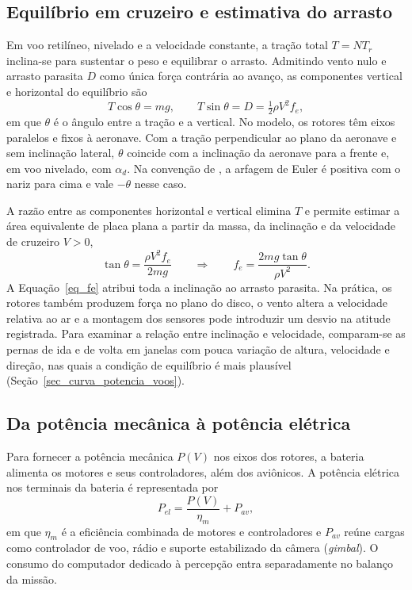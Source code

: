 \subsection{Equilíbrio em cruzeiro e estimativa do arrasto}

Em voo retilíneo, nivelado e a velocidade constante, a tração total $T=NT_r$ inclina-se para sustentar o peso e equilibrar o arrasto. Admitindo vento nulo e arrasto parasita $D$ como única força contrária ao avanço, as componentes vertical e horizontal do equilíbrio são \cite[p.~101, 109]{etkin1996}
\begin{equation}
  T\cos\theta = mg, \qquad T\sin\theta = D = \tfrac{1}{2}\rho V^{2} f_e,
  \label{eq_equilibrio}
\end{equation}
em que $\theta$ é o ângulo entre a tração e a vertical. No modelo, os rotores têm eixos paralelos e fixos à aeronave. Com a tração perpendicular ao plano da aeronave e sem inclinação lateral, $\theta$ coincide com a inclinação da aeronave para a frente e, em voo nivelado, com $\alpha_d$. Na convenção de , a arfagem de Euler é positiva com o nariz para cima e vale $-\theta$ nesse caso.

A razão entre as componentes horizontal e vertical elimina $T$ e permite estimar a área equivalente de placa plana a partir da massa, da inclinação e da velocidade de cruzeiro $V>0$,
\begin{equation}
  \tan\theta = \frac{\rho V^{2} f_e}{2 m g}
  \qquad\Longrightarrow\qquad
  f_e = \frac{2 m g \tan\theta}{\rho V^{2}}.
  \label{eq_fe}
\end{equation}
A Equação~\eqref{eq_fe} atribui toda a inclinação ao arrasto parasita. Na prática, os rotores também produzem força no plano do disco, o vento altera a velocidade relativa ao ar e a montagem dos sensores pode introduzir um desvio na atitude registrada. Para examinar a relação entre inclinação e velocidade, comparam-se as pernas de ida e de volta em janelas com pouca variação de altura, velocidade e direção, nas quais a condição de equilíbrio é mais plausível (Seção~\ref{sec_curva_potencia_voos}).

\subsection{Da potência mecânica à potência elétrica}

Para fornecer a potência mecânica $P(V)$ nos eixos dos rotores, a bateria alimenta os motores e seus controladores, além dos aviônicos. A potência elétrica nos terminais da bateria é representada por
\begin{equation}
  P_{el} = \frac{P(V)}{\eta_{m}} + P_{av},
  \label{eq_pel}
\end{equation}
em que $\eta_m$ é a eficiência combinada de motores e controladores e $P_{av}$ reúne cargas como controlador de voo, rádio e suporte estabilizado da câmera (\textit{gimbal}). O consumo do computador dedicado à percepção entra separadamente no balanço da missão.

